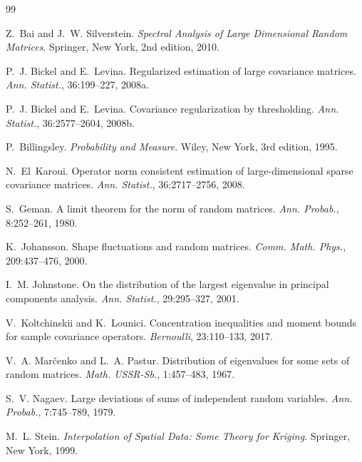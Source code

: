 \documentclass[11pt]{article}
\begin{document}
\begin{thebibliography}{99}

Z.~Bai and J.~W. Silverstein.
\newblock \emph{Spectral Analysis of Large Dimensional Random Matrices}.
\newblock Springer, New York, 2nd edition, 2010.

P.~J. Bickel and E.~Levina.
\newblock Regularized estimation of large covariance matrices.
\newblock \emph{Ann. Statist.}, 36:199--227, 2008a.

P.~J. Bickel and E.~Levina.
\newblock Covariance regularization by thresholding.
\newblock \emph{Ann. Statist.}, 36:2577--2604, 2008b.

P.~Billingsley.
\newblock \emph{Probability and Measure}.
\newblock Wiley, New York, 3rd edition, 1995.

N.~El~Karoui.
\newblock Operator norm consistent estimation of large-dimensional sparse covariance matrices.
\newblock \emph{Ann. Statist.}, 36:2717--2756, 2008.

S.~Geman.
\newblock A limit theorem for the norm of random matrices.
\newblock \emph{Ann. Probab.}, 8:252--261, 1980.

K.~Johansson.
\newblock Shape fluctuations and random matrices.
\newblock \emph{Comm. Math. Phys.}, 209:437--476, 2000.

I.~M. Johnstone.
\newblock On the distribution of the largest eigenvalue in principal components analysis.
\newblock \emph{Ann. Statist.}, 29:295--327, 2001.

V.~Koltchinskii and K.~Lounici.
\newblock Concentration inequalities and moment bounds for sample covariance operators.
\newblock \emph{Bernoulli}, 23:110--133, 2017.

V.~A. Mar\v{c}enko and L.~A. Pastur.
\newblock Distribution of eigenvalues for some sets of random matrices.
\newblock \emph{Math. USSR-Sb.}, 1:457--483, 1967.

S.~V. Nagaev.
\newblock Large deviations of sums of independent random variables.
\newblock \emph{Ann. Probab.}, 7:745--789, 1979.

M.~L. Stein.
\newblock \emph{Interpolation of Spatial Data: Some Theory for Kriging}.
\newblock Springer, New York, 1999.


\end{thebibliography}
\end{document}
